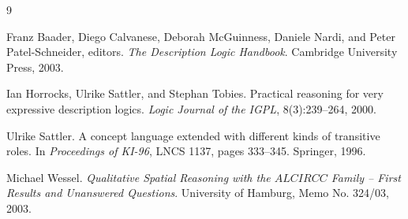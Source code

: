 \documentclass[11pt]{article}
\theoremstyle{definition}
\begin{document}
\begin{thebibliography}{9}

Franz Baader, Diego Calvanese, Deborah McGuinness, Daniele Nardi, and Peter Patel-Schneider, editors.
\newblock \emph{The Description Logic Handbook}.
\newblock Cambridge University Press, 2003.

Ian Horrocks, Ulrike Sattler, and Stephan Tobies.
\newblock Practical reasoning for very expressive description logics.
\newblock \emph{Logic Journal of the IGPL}, 8(3):239--264, 2000.

Ulrike Sattler.
\newblock A concept language extended with different kinds of transitive roles.
\newblock In \emph{Proceedings of KI-96}, LNCS 1137, pages 333--345. Springer, 1996.

Michael Wessel.
\newblock \emph{Qualitative Spatial Reasoning with the $ALCIRCC$ Family -- First Results and Unanswered Questions}.
\newblock University of Hamburg, Memo No. 324/03, 2003.

\end{thebibliography}
\end{document}
